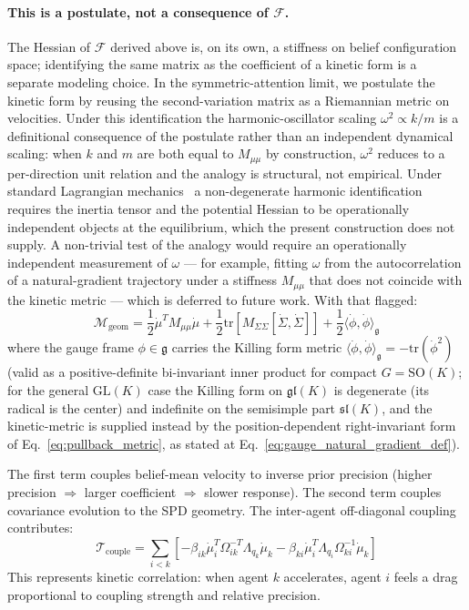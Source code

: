 \documentclass[11pt]{article}
\begin{document}
\paragraph{This is a postulate, not a consequence of $\mathcal{F}$.} The Hessian of $\mathcal{F}$ derived above is, on its own, a stiffness on belief configuration space; identifying the same matrix as the coefficient of a kinetic form is a separate modeling choice. In the symmetric-attention limit, we postulate the kinetic form by reusing the second-variation matrix as a Riemannian metric on velocities. Under this identification the harmonic-oscillator scaling $\omega^2 \propto k/m$ is a definitional consequence of the postulate rather than an independent dynamical scaling: when $k$ and $m$ are both equal to $M_{\mu\mu}$ by construction, $\omega^2$ reduces to a per-direction unit relation and the analogy is structural, not empirical. Under standard Lagrangian mechanics~\cite{arnold1989mathematical} a non-degenerate harmonic identification requires the inertia tensor and the potential Hessian to be operationally independent objects at the equilibrium, which the present construction does not supply. A non-trivial test of the analogy would require an operationally independent measurement of $\omega$ — for example, fitting $\omega$ from the autocorrelation of a natural-gradient trajectory under a stiffness $M_{\mu\mu}$ that does not coincide with the kinetic metric — which is deferred to future work. With that flagged:
\begin{equation}
\mathcal{M}_{\text{geom}} = \frac{1}{2}\dot{\mu}^T M_{\mu\mu} \dot{\mu} + \frac{1}{2}\mathrm{tr}\left[M_{\Sigma\Sigma}[\dot{\Sigma}, \dot{\Sigma}]\right] + \frac{1}{2}\langle\dot{\phi}, \dot{\phi}\rangle_{\mathfrak{g}}
\label{eq:full_kinetic}
\end{equation}
where the gauge frame $\phi \in \mathfrak{g}$ carries the Killing form metric $\langle \dot{\phi}, \dot{\phi} \rangle_{\mathfrak{g}} = -\mathrm{tr}(\dot{\phi}^2)$ (valid as a positive-definite bi-invariant inner product for compact $G = \mathrm{SO}(K)$; for the general $\mathrm{GL}(K)$ case the Killing form on $\mathfrak{gl}(K)$ is degenerate (its radical is the center) and indefinite on the semisimple part $\mathfrak{sl}(K)$, and the kinetic-metric is supplied instead by the position-dependent right-invariant form of Eq.~\eqref{eq:pullback_metric}, as stated at Eq.~\eqref{eq:gauge_natural_gradient_def}).

The first term couples belief-mean velocity to inverse prior precision (higher precision $\Rightarrow$ larger coefficient $\Rightarrow$ slower response). The second term couples covariance evolution to the SPD geometry. The inter-agent off-diagonal coupling contributes:
\begin{equation}
\mathcal{T}_{\mathrm{couple}} = \sum_{i < k}\left[-\beta_{ik}\dot{\mu}_i^T \Omega_{ik}^{-T}\Lambda_{q_k}\dot{\mu}_k - \beta_{ki}\dot{\mu}_i^T \Lambda_{q_i}\Omega_{ki}^{-1} \dot{\mu}_k\right]
\end{equation}
This represents kinetic correlation: when agent $k$ accelerates, agent $i$ feels a drag proportional to coupling strength and relative precision.
\end{document}
